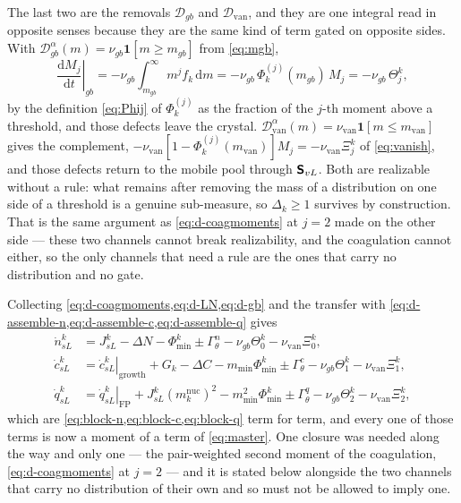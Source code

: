 The last two are the removals $\mathcal D_{gb}$ and $\mathcal D_{\mathrm{van}}$,
and they are one integral read in opposite senses because they are the same
kind of term gated on opposite sides. With
$\mathcal D^{\alpha}_{gb}(m)=\nu_{gb}\mathbf 1[m\ge m_{gb}]$ from
\cref{eq:mgb},
\begin{equation}
  \left.\frac{\mathrm dM_j}{\mathrm dt}\right|_{gb}
   =-\nu_{gb}\!\!\int_{m_{gb}}^{\infty}\!\!m^{j}f_k\,\mathrm dm
   =-\nu_{gb}\,\Phi^{(j)}_k(m_{gb})\,M_j
   =-\nu_{gb}\,\Theta^{k}_{j},
  \label{eq:d-gb}
\end{equation}
by the definition \cref{eq:Phij} of $\Phi^{(j)}_k$ as the fraction of the
$j$-th moment above a threshold, and those defects leave the crystal.
$\mathcal D^{\alpha}_{\mathrm{van}}(m)=\nu_{\mathrm{van}}\mathbf 1[m\le
m_{\mathrm{van}}]$ gives the complement,
$-\nu_{\mathrm{van}}[1-\Phi^{(j)}_k(m_{\mathrm{van}})]M_j
 =-\nu_{\mathrm{van}}\Xi^{k}_{j}$ of \cref{eq:vanish}, and those defects return
to the mobile pool through $\bm{\mathsf{S}}_{vL}$. Both are realizable without a rule:
what remains after removing the mass of a distribution on one side of a
threshold is a genuine sub-measure, so $\Delta_k\ge1$ survives by construction.
That is the same argument as \cref{eq:d-coagmoments} at $j=2$ made on the other
side --- these two channels cannot break realizability, and the coagulation
cannot either, so the only channels that need a rule are the ones that carry no
distribution and no gate.

Collecting \cref{eq:d-coagmoments,eq:d-LN,eq:d-gb} and the transfer with
\cref{eq:d-assemble-n,eq:d-assemble-c,eq:d-assemble-q} gives
\begin{align}
  \dot n^k_{sL} &= J^k_{sL} - \Delta N - \Phi^k_{\min} \pm \Gamma^{n}_{\theta}
                   - \nu_{gb}\Theta^{k}_{0} - \nu_{\mathrm{van}}\Xi^{k}_{0},
  \nonumber\\
  \dot c^k_{sL} &= \left.\dot c^k_{sL}\right|_{\mathrm{growth}}
                   + G_k - \Delta C - m_{\min}\Phi^k_{\min}
                   \pm \Gamma^{c}_{\theta}
                   - \nu_{gb}\Theta^{k}_{1} - \nu_{\mathrm{van}}\Xi^{k}_{1},
  \nonumber\\
  \dot q^k_{sL} &= \left.\dot q^k_{sL}\right|_{\mathrm{FP}}
                   + J^k_{sL}(m^{\mathrm{nuc}}_k)^{2} - m^{2}_{\min}\Phi^k_{\min}
                   \pm \Gamma^{q}_{\theta}
                   - \nu_{gb}\Theta^{k}_{2} - \nu_{\mathrm{van}}\Xi^{k}_{2},
  \label{eq:d-block}
\end{align}
which are \cref{eq:block-n,eq:block-c,eq:block-q} term for term, and every one
of those terms is now a moment of a term of \cref{eq:master}. One closure was
needed along the way and only one --- the pair-weighted second moment of the
coagulation, \cref{eq:d-coagmoments} at $j=2$ --- and it is stated below
alongside the two channels that carry no distribution of their own and so must
not be allowed to imply one.

